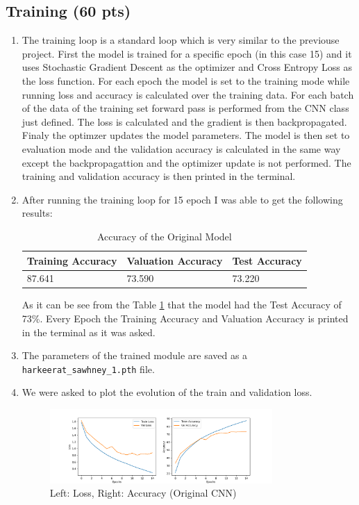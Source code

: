 \documentclass[a4paper]{article}
\newcommand{\codeword}[1]{\texttt{\textcolor{code}{#1}}}
\begin{document}
\subsection{Training (60 pts)}
\begin{enumerate}
	\item The training loop is a standard loop which is very similar to the previouse project. First the model is trained for a specific epoch (in this case 15) and it uses Stochastic Gradient Descent as the optimizer and Cross Entropy Loss as the loss function. For each epoch the model is set to the training mode while running loss and accuracy is calculated over the training data. For each batch of the data of the training set forward pass is performed from the CNN class just defined. The loss is calculated and the gradient is then backpropagated. Finaly the optimzer updates the model parameters. The model is then set to evaluation mode and the validation accuracy is calculated in the same way except the backpropagattion and the optimizer update is not performed. The training and validation accuracy is then printed in the terminal.
	\item After running the training loop for 15 epoch I was able to get the following results:
	      \begin{table}[H]
		      \centering
		      \begin{tabular}{|l|l|l|}
			      \hline
			      \textbf{Training Accuracy} & \textbf{Valuation Accuracy} & \textbf{Test Accuracy} \\
			      \hline
			      87.641                     & 73.590                      & 73.220                 \\

			      \hline
		      \end{tabular}
		      \caption{Accuracy of the Original Model}
		      \label{tab:question1.3.1}
	      \end{table}

	      As it can be see from the Table \ref{tab:question1.3.1} that the model had the Test Accuracy of 73\%. Every Epoch the Training Accuracy and Valuation Accuracy is printed in the terminal as it was asked.
	\item The parameters of the trained module are saved as a \codeword{harkeerat\_sawhney\_1.pth} file.
	\item  We were asked to plot the evolution of the train and validation loss.

	      \begin{figure}[H]
		      \centering
		      \includegraphics[width=0.8\textwidth]{"../figures/1.3/loss_accuracy.png"}
		      \caption{Left: Loss, Right: Accuracy (Original CNN)}
		      \label{fig:question1.3.1}
	      \end{figure}


\end{enumerate}
\end{document}
